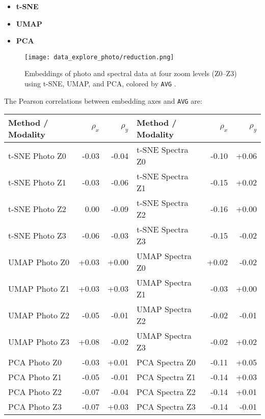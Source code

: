 \documentclass[english,bachelor,oneside]{ctufit-thesis}
\begin{document}
\begin{itemize}
  \item \textbf{t-SNE} \cite{maaten2008visualizing}
  \item \textbf{UMAP} \cite{mcinnes2018umap}
  \item \textbf{PCA} \cite{jolliffe2002principal}
\end{itemize}

\begin{figure}[H]
  \centering
  \texttt{[image: data\_explore\_photo/reduction.png]}
  \caption{Embeddings of photo and spectral data at four zoom levels (Z0–Z3) using t-SNE, UMAP, and PCA, colored by \texttt{AVG} \cite{combined}.}
  \label{fig:embeddings_all}
\end{figure}

The Pearson correlations between embedding axes and \texttt{AVG} are:

\begin{center}
\begin{tabular}{lrr|lrr}
\toprule
\textbf{Method / Modality}     & $\rho_x$ & $\rho_y$  & \textbf{Method / Modality}     & $\rho_x$ & $\rho_y$ \\
\midrule
t-SNE Photo Z0 & -0.03 & -0.04 & t-SNE Spectra Z0 & -0.10 & +0.06 \\
t-SNE Photo Z1 & -0.03 & -0.06 & t-SNE Spectra Z1 & -0.15 & +0.02 \\
t-SNE Photo Z2 &  0.00 & -0.09 & t-SNE Spectra Z2 & -0.16 & +0.00 \\
t-SNE Photo Z3 & -0.06 & -0.03 & t-SNE Spectra Z3 & -0.15 & -0.02 \\
\midrule
UMAP Photo Z0 & +0.03 & +0.00 & UMAP Spectra Z0 & +0.02 & -0.02 \\
UMAP Photo Z1 & +0.03 & +0.03 & UMAP Spectra Z1 & -0.03 & +0.00 \\
UMAP Photo Z2 & -0.05 & -0.01 & UMAP Spectra Z2 & -0.02 & -0.01 \\
UMAP Photo Z3 & +0.08 & -0.02 & UMAP Spectra Z3 & -0.02 & +0.02 \\
\midrule
PCA Photo Z0  & -0.03 & +0.01 & PCA Spectra Z0  & -0.11 & +0.05 \\
PCA Photo Z1  & -0.05 & -0.01 & PCA Spectra Z1  & -0.14 & +0.03 \\
PCA Photo Z2  & -0.07 & -0.04 & PCA Spectra Z2  & -0.14 & +0.01 \\
PCA Photo Z3  & -0.07 & +0.03 & PCA Spectra Z3  & -0.14 & -0.01 \\
\bottomrule
\end{tabular}
\end{center}
\end{document}
